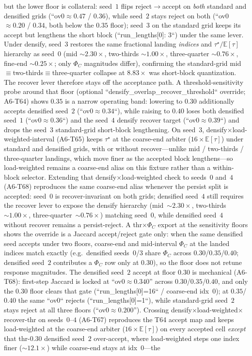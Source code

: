 \documentclass[11pt]{article}
\theoremstyle{definition}
\theoremstyle{plain}
\begin{document}
but the lower floor is collateral: seed~$1$ flips reject$\to$accept on \emph{both} standard and densified grids (``ov0$\approx 0.47$ / $0.36$), while seed~$2$ stays reject on both (``ov0$\approx 0.20$ / $0.34$, both below the $0.35$ floor); seed~$3$ on the standard grid keeps its accept but lengthens the short block (``run_lengths[0]: 3``) under the same lever. Under densify, seed~$3$ restores the same fractional landing \emph{indices} and $\tau^\star/\mathbb{E}[\tau]$ hierarchy as seed~$0$ (mid $\sim 2.30\times$, two-thirds $\sim 1.00\times$, three-quarter $\sim 0.76\times$, fine-end $\sim 0.25\times$; only $\Phi_C$ magnitudes differ), confirming the standard-grid mid$\equiv$two-thirds$\equiv$three-quarter collapse at $8.83\times$ was short-block quantization. The recover lever therefore stays off the acceptance path. A threshold-sensitivity probe around that floor (optional ``densify_overlap_recover_threshold`` override; A6-T64) shows $0.35$ is a narrow operating band: lowering to $0.30$ additionally accepts densified seed~$2$ (``ov0$\approx 0.34$``), while raising to $0.40$ loses both densified seed~$1$ (``ov0$\approx 0.36$``) and the seed~$4$ densify recover target (``ov0$\approx 0.39$``) and drops the seed~$3$ standard-grid short-block lengthening. On seed~$3$, densify$\times$load-weighted-interval (A6-T65) keeps $\tau^\star$ at the coarse-end arbiter ($16\times\mathbb{E}[\tau]$) under standard and densified grids, with or without recover---unlike mid / two-thirds / three-quarter landings, which move finer as the accepted block lengthens---so load-weighted remains a coarse-end alias on this fixture rather than a within-block selector. Extending that densify$\times$load-weighted check to seeds~$0$ and~$4$ (A6-T68) reproduces the same coarse-end alias whenever the persist split is accepted: seed~$0$ is recover-invariant on both grids; densified seed~$4$ still requires the recover lever to expose the densify hierarchy (mid~$\sim 2.30\times$, two-thirds~$\sim 1.00\times$, three-quarter~$\sim 0.76\times$) matching seed~$0$, while densified seed~$4$ without recover remains a persist-reject. A thr$\times\Phi_C$ export at the sensitivity floors shows the override is a Jaccard accept/reject gate only: when the same densified seed accepts under two floors, coarse-end and mid-interval $\Phi_C$ at the landed indices match exactly (e.g.\ densified seeds~$0$/$3$ share $\Phi_C$ across $0.30$/$0.35$/$0.40$; densified seed~$2$ contributes a $\Phi_C$ row only at $0.30$), so the floor does not retune response magnitudes. The densified seed~$2$ accept at floor $0.30$ is mechanical (A6-T68): first-step Jaccard is locked at ``ov0$\approx 0.340$'' across $0.30$/$0.35$/$0.40$, and only the $0.30$ floor clears that gate (``run_lengths[0]=16`` / coarse-end idx~$0$); at $0.35$/$0.40$ the same ``ov0`` rejects (``run_lengths[0]=1``), while standard-grid seed~$2$ stays reject at all three floors (``ov0$\approx 0.200$''). Crossing densify$\times$load-weighted$\times$recover-thr on seeds~$0$--$4$ (A6-T67) reproduces the T64 accept map and keeps load-weighted at the coarse-end arbiter ($16\times\mathbb{E}[\tau]$) on every accepted cell \emph{except} that thr-$0.30$ densified seed~$2$ over-accept, where load-weighted steps one index finer ($\sim 12.1\times$) while coarse-end stays at idx~$0$---the 
\end{document}
